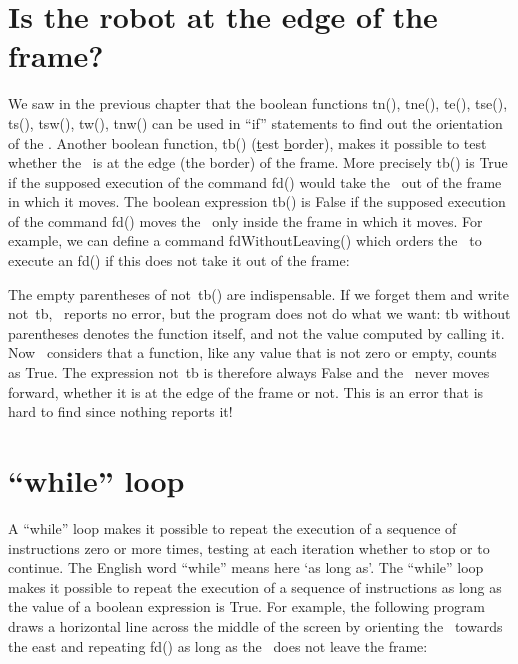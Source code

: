 \section{Is the robot at the edge of the frame?}
We saw in the previous chapter that the boolean functions {\idt tn()}, {\idt tne()}, {\idt te()}, {\idt tse()}, {\idt ts()},
 {\idt tsw()}, {\idt tw()}, {\idt tnw()} can be used in ``if''
 statements to find out the orientation of the \robot. Another boolean function,
 {\idt tb()} (\underline{t}est \underline{b}order), makes it possible to test whether
 the \robot\ is at the edge (the border) of the frame. More precisely {\idt tb()} is {\mcl True}
 if the supposed execution of the command {\idt fd()} would take
 the \robot\ out of the frame in which it moves.  The boolean expression
 {\idt tb()} is {\mcl False} if the supposed execution
 of the command {\idt fd()} moves the \robot\ only inside the frame in which it moves.
For example, we can
 define a command {\idt fdWithoutLeaving()} which orders the \robot\ to execute an {\idt fd()} if this does not
 take it out of the frame:



{\sloppy\noindent The empty parentheses of {\mcl not}\ {\idt tb()} are indispensable.
If we forget them and write {\mcl not}\ {\idt tb}, \python\ reports no error,
but the program does not do what we want: {\idt tb} without parentheses denotes the
function itself, and not the value computed by calling it. Now \python\ considers
that a function, like any value that is not zero or empty, counts as {\mcl True}.
The expression {\mcl not}\ {\idt tb} is therefore always {\mcl False} and the \robot\
never moves forward, whether it is at the edge of the frame or not. This is an error that is hard to find
since nothing reports it!\par}

\section{``while'' loop}

 A ``while'' loop makes it possible to repeat the execution of a sequence of in\-struc\-tions zero
or more times, testing at each iteration whether to stop or to continue. The English word
``while'' means here `as long as'. The ``while'' loop makes it possible to
repeat the execution of a sequence of instructions as long as the value of a boolean expression
is {\mcl True}. For example, the following program draws a horizontal line across the middle
of the screen by orienting the \robot\ towards the east and repeating {\idt fd()} as long as the \robot\ does not leave
the frame:

